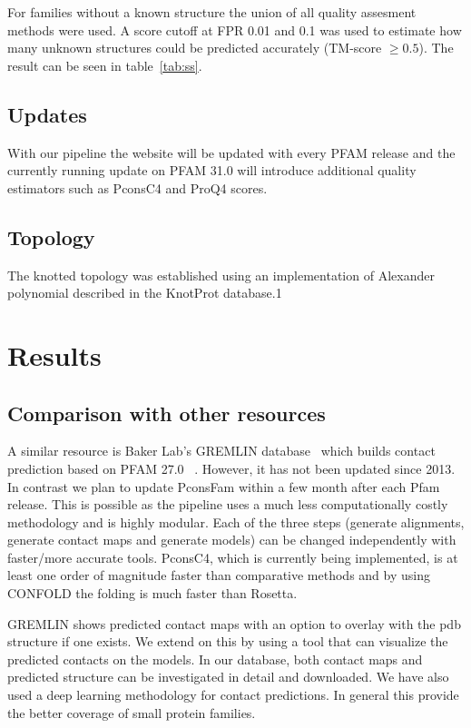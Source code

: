 \documentclass[a4,center,fleqn]{NAR}
\begin{document}
For families without a known structure the union of all quality assesment methods were used.
A score cutoff at FPR 0.01 and 0.1 was used to estimate how many unknown structures
could be predicted accurately (TM-score $\ge 0.5$). The result can be seen in table~\ref{tab:ss}.
\subsection{Updates}

With our pipeline the website will be updated with every PFAM release
and the currently running update on PFAM 31.0 will introduce
additional quality estimators such as PconsC4 and ProQ4
scores. 

\subsection{Topology}
The knotted topology was established using an implementation
of Alexander polynomial described in the KnotProt database.1

\section{Results}

\subsection{Comparison with other resources}

A similar resource is Baker Lab’s GREMLIN database~\cite{Kamisetty2013} which builds contact prediction based on
PFAM 27.0~\cite{Sonnhammer:1997} . However, it has not been updated since
2013. In contrast we plan to update PconsFam within a few month after
each Pfam release. This is possible as the pipeline uses a much less
computationally costly methodology and is highly modular. Each of the three steps
(generate alignments, generate contact maps and generate models) can be changed
independently with faster/more accurate tools. PconsC4, which is currently
being implemented, is at least one order of
magnitude faster than comparative methods and by using CONFOLD the
folding is much faster than Rosetta.


GREMLIN shows predicted contact maps with an option to overlay with
the pdb structure if one exists. We extend on this by using a tool
that can visualize the predicted contacts on the models. In our
database, both contact maps and predicted structure can be
investigated in detail and downloaded.  We have also used a deep
learning methodology for contact predictions. In general this provide
the better coverage of small protein families.
\end{document}
